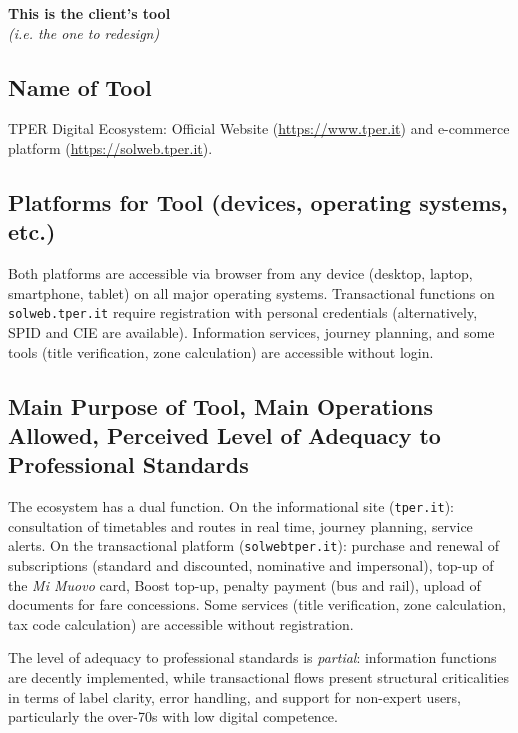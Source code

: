 ﻿\documentclass[11pt,a4paper]{article}
\begin{document}
\textbf{This is the client's tool}\\
\textit{(i.e. the one to redesign)}

\bigskip

\subsection*{Name of Tool}

\noindent TPER Digital Ecosystem: Official Website (\url{https://www.tper.it})
and e-commerce platform (\url{https://solweb.tper.it}).

\subsection*{Platforms for Tool (devices, operating systems, etc.)}

\noindent Both platforms are accessible via browser from any
device (desktop, laptop, smartphone, tablet) on all major
operating systems. Transactional functions on \texttt{solweb.tper.it}
require registration with personal credentials (alternatively,
SPID and CIE are available). Information services, journey
planning, and some tools (title verification, zone calculation) are
accessible without login.

{\raggedright\subsection*{Main Purpose of Tool, Main Operations Allowed, Perceived Level of Adequacy to Professional Standards}\par}

\noindent The ecosystem has a dual function. On the informational site
(\texttt{tper.it}): consultation of timetables and routes in real time,
journey planning, service alerts. On the transactional platform
(\texttt{solweb}\texttt{tper.it}): purchase and renewal of subscriptions
(standard and discounted, nominative and impersonal), top-up of the
\textit{Mi Muovo} card, Boost top-up, penalty payment (bus and rail),
upload of documents for fare concessions. Some services
(title verification, zone calculation, tax code calculation) are accessible
without registration.

\noindent The level of adequacy to professional standards is
\textit{partial}: information functions are decently implemented,
while transactional flows present structural criticalities in terms of
label clarity, error handling, and support for non-expert
users, particularly the over-70s with low digital competence.
\end{document}
